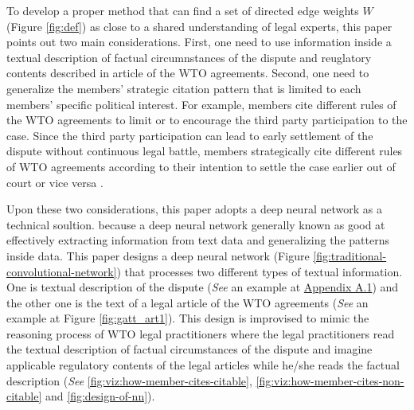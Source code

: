 To develop a proper method that can find a set of directed edge weights $W$ (Figure \ref{fig:def}) 
as close to a shared understanding of legal experts, this paper points out two main considerations. 
First, one need to use information inside a textual description of factual circumnstances of the dispute and reuglatory contents described in article of the WTO agreements.
Second, one need to generalize the members' strategic citation pattern that is limited to each members' specific political interest.
For example,
members cite different rules of the WTO agreements to limit or to encourage
the third party participation to the case. Since the third party participation
can lead to early settlement of the dispute without continuous
legal battle, members strategically cite different rules of WTO agreements according to their intention to
settle the case earlier out of court or vice versa \citep{who_gets}. 

Upon these two considerations, this paper adopts a deep neural network as a technical soultion.
because a deep neural network generally known as good at effectively extracting information from text data and generalizing the patterns inside data. 
This paper designs a deep neural network (Figure \ref{fig:traditional-convolutional-network}) that
processes two different types of textual information.
One is textual description of the dispute (\textit{See} an example at \hyperref[sub:factual-aspect-example]{Appendix A.1}) and
the other one is the text of a legal article of the WTO agreements (\textit{See} an example at Figure \ref{fig:gatt_art1}).
This design is improvised to mimic
the reasoning process of WTO legal practitioners
where the legal practitioners read
the textual description of
factual circumstances of the dispute and imagine applicable regulatory contents of
the legal articles while he/she reads the factual description (\textit{See} \ref{fig:viz:how-member-cites-citable}, \ref{fig:viz:how-member-cites-non-citable} and \ref{fig:design-of-nn}).





